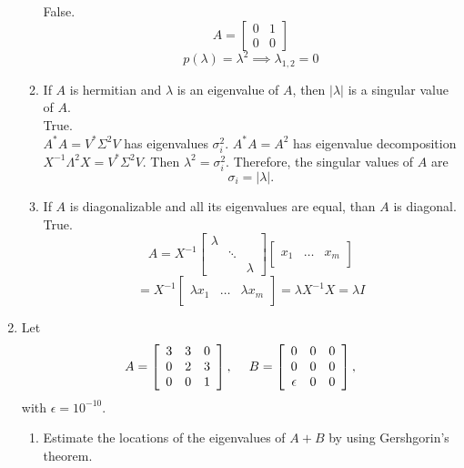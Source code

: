 \documentclass[12pt]{article}
\numberwithin{equation}{section}
\begin{document}
\begin{enumerate}
\begin{enumerate}
    False.\\
    $$A=\left[\begin{array}{cc}0&1\\0&0\end{array}\right]$$
    $$p(\lambda)=\lambda^2\implies \lambda_{1,2}=0$$
    \item If $A$ is hermitian and $\lambda$ is an eigenvalue of $A$, then $|\lambda|$ is a singular value of $A$.\\

        True.\\
        $A^*A=V^*\Sigma^2 V$ has eigenvalues $\sigma_i^2$. $A^*A=A^2$ has eigenvalue decomposition $X^{-1}\Lambda^2 X=V^*\Sigma^2 V$. Then $\lambda^2=\sigma_i^2$. Therefore, the singular values of $A$ are
        $$\sigma_i=|\lambda|.$$

    \item If $A$ is diagonalizable and all its eigenvalues are equal, than $A$ is diagonal.\\

    True.
    $$A=X^{-1}\left[\begin{array}{ccc}\lambda&&\\&\ddots&\\&&\lambda\end{array}\right]\left[\begin{array}{c|c|c}&&\\x_1&\dots&x_m\\&&\end{array}\right]$$
    $$=X^{-1}\left[\begin{array}{c|c|c}&&\\ \lambda x_1&\dots&\lambda x_m\\&&\end{array}\right]=\lambda X^{-1}X=\lambda I$$
    \end{enumerate}
    \pagebreak
\item Let
$$A=\left[\begin{array}{ccc}3&3&0\\0&2&3\\0&0&1\end{array}\right],\hspace{3 ex}B=\left[\begin{array}{ccc}0&0&0\\0&0&0\\\epsilon&0&0\end{array}\right],$$
 with $\epsilon=10^{-10}$.

    \begin{enumerate}
    \item Estimate the locations of the eigenvalues of $A+B$ by using Gershgorin's theorem.\\


\end{enumerate}
\end{enumerate}
\end{document}
